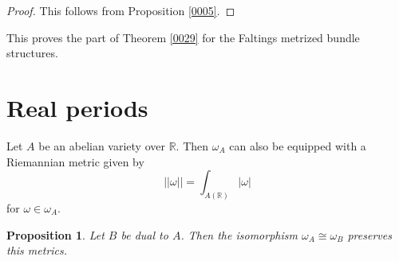 \documentclass{amsart}
\newtheorem{proposition}[theorem]{Proposition}
\theoremstyle{remark}
\numberwithin{equation}{section}
\newcommand{\R}{\mathbb{R}}
\begin{document}
\begin{proof}
	This follows from Proposition \ref{0005}.
\end{proof}

This proves the part of Theorem \ref{0029}
for the Faltings metrized bundle structures.


\section{Real periods}

Let $A$ be an abelian variety over $\R$.
Then $\omega_{A}$ can also be equipped with a Riemannian metric
given by
	\begin{equation} \label{0019}
			||\omega||
		=
			\int_{A(\R)} |\omega|
	\end{equation}
for $\omega \in \omega_{A}$.

\begin{proposition} \label{0020}
	Let $B$ be dual to $A$.
	Then the isomorphism $\omega_{A} \cong \omega_{B}$
	preserves this metrics.
\end{proposition}
\end{document}
